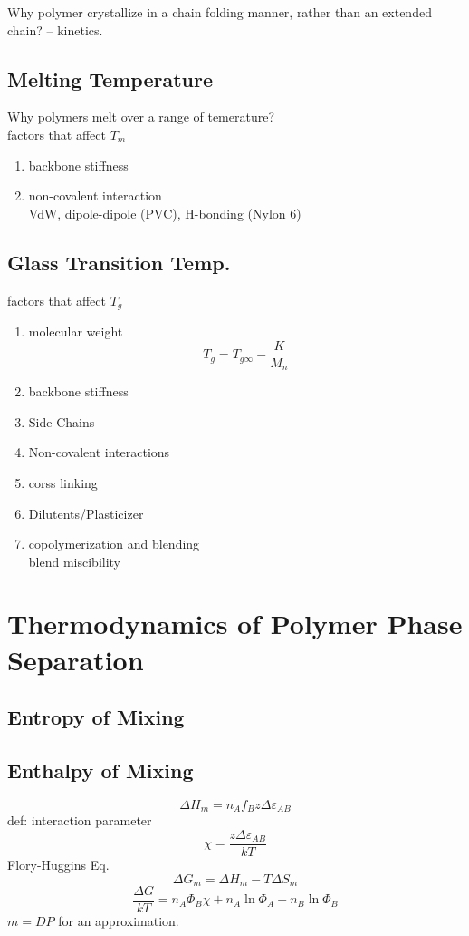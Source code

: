 \documentclass[a4paper]{article}
\begin{document}
Why polymer crystallize in a chain folding manner, rather than an extended chain? -- kinetics.


\subsection{Melting Temperature}
Why polymers melt over a range of temerature?\\
factors that affect $ T_m $
\begin{enumerate}
	\item backbone stiffness
	\item non-covalent interaction\\
	VdW, dipole-dipole (PVC), H-bonding (Nylon 6)
	
\end{enumerate}

\subsection{Glass Transition Temp.}
factors that affect $ T_g $
\begin{enumerate}
	\item molecular weight
	\begin{equation}\label{key}
	T_g = T_{g\infty} - \dfrac{K}{M_n}
	\end{equation}
	\item backbone stiffness
	\item Side Chains
	\item Non-covalent interactions
	\item corss linking
	\item Dilutents/Plasticizer
	\item copolymerization and blending\\
	blend miscibility
\end{enumerate}

\section{Thermodynamics of Polymer Phase Separation}
\subsection{Entropy of Mixing}

\subsection{Enthalpy of Mixing}
\begin{equation}\label{key}
\Delta H_m = n_A f_B z \Delta\varepsilon_{AB}
\end{equation}
def: interaction parameter
\begin{equation}\label{key}
\chi = \dfrac{z\Delta\varepsilon_{AB}}{kT}
\end{equation}
Flory-Huggins Eq.
\begin{equation}\label{key}
\Delta G_m = \Delta H_m - T\Delta S_m
\end{equation}
\begin{equation}\label{key}
\dfrac{\Delta G}{kT} = n_A\Phi_B\chi + n_A\ln\Phi_A + n_B\ln\Phi_B
\end{equation}
$ m=DP $ for an approximation.
\end{document}
